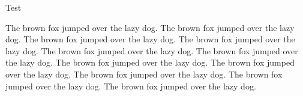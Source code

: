 \documentclass{beamer}
\begin{document}
\begin{frame}{Test}
  \begin{example}
    The brown fox jumped over the lazy dog. The brown fox jumped over
    the lazy dog. The brown fox jumped over the lazy dog. The brown
    fox jumped over the lazy dog. The brown fox jumped over the lazy
    dog. The brown fox jumped over the lazy dog. The brown fox jumped
    over the lazy dog. The brown fox jumped over the lazy dog. The
    brown fox jumped over the lazy dog. The brown fox jumped over the
    lazy dog. The brown fox jumped over the lazy dog.
  \end{example}
\end{frame}
\end{document}

